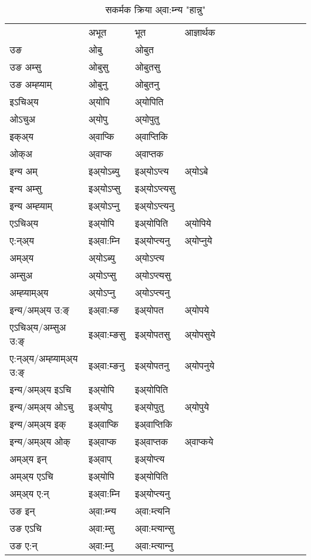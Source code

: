 \begin{table}[H]
\label{op.vt} \centering
\caption{सकर्मक क्रिया  अ्वा:म्‍न्य  "हान्नु"  }
\begin{tabular}{l|l|l|l|l|l|l|l|l|l|l|l|l}  \toprule
&अभूत & भूत & आज्ञार्थक \\ 
उङ &ओबु &ओबुत \\ 
उङ अम्सु &ओबुसु &ओबुतसु \\ 
उङ अम्ह्‍याम् &ओबुनु &ओबुतनु \\ 
इऽचिअ्य &अ्योपि &अ्योपिति   \\ 
ओऽचुअ &अ्योपु &अ्योपुतु   \\ 
इक्अ्य &अ्वाप्कि &अ्वाप्‍तिकि   \\ 
ओक्अ &अ्वाप्क &अ्वाप्‍तक   \\ 
इन्य अम् & इअ्योऽब्यु  & इअ्योऽप्‍त्य &अ्योऽबे  \\ 
इन्य अम्सु & इअ्योऽप्सु  & इअ्योऽप्‍त्यसु   \\ 
इन्य अम्ह्‍याम् & इअ्योऽप्‍नु  & इअ्योऽप्‍त्यनु   \\ 
एऽचिअ्य & इअ्योपि & इअ्योपिति &अ्योपिये    \\ 
ए:न्अ्य & इअ्वा:म्‍नि  & इअ्योप्‍त्यनु &अ्योप्‍नुये  \\ 
अम्अ्य & अ्योऽब्यु  & अ्योऽप्‍त्य  \\ 
अम्सुअ & अ्योऽप्सु & अ्योऽप्‍त्यसु  \\ 
अम्ह्‍याम्अ्य & अ्योऽप्‍नु  & अ्योऽप्‍त्यनु \\ 
\midrule
इन्य/अम्अ्य उ:ङ्‌&इअ्वा:म्ङ & इअ्योपत &अ्योपये \\ 
एऽचिअ्य/अम्सुअ उ:ङ्‌ &इअ्वा:म्ङसु & इअ्योपतसु &अ्योपसुये \\ 
ए:न्अ्य/अम्ह्‍याम्अ्य उ:ङ्‌ &इअ्वा:म्ङनु & इअ्योपतनु &अ्योपनुये \\ 
इन्य/अम्अ्य इऽचि & इअ्योपि & इअ्योपिति    \\ 
इन्य/अम्अ्य ओऽचु & इअ्योपु & इअ्योपुतु  &अ्योपुये  \\ 
इन्य/अम्अ्य इक् & इअ्वाप्कि & इअ्वाप्‍तिकि   \\ 
इन्य/अम्अ्य ओक् & इअ्वाप्क & इअ्वाप्‍तक  &अ्वाप्कये  \\ 
अम्अ्य इन् & इअ्वाप् & इअ्योप्‍त्य   \\ 
अम्अ्य एऽचि & इअ्योपि & इअ्योपिति    \\ 
अम्अ्य ए:न् & इअ्वा:म्‍नि  & इअ्योप्‍त्यनु  \\ 
\midrule
उङ इन् & अ्वा:म्‍न्य  & अ्वा:म्त्यनि  \\ 
उङ एऽचि & अ्वा:म्सु  & अ्वा:म्त्यान्सु   \\ 
उङ ए:न्& अ्वा:म्‍नु  & अ्वा:म्त्यान्‍नु   \\ 
\bottomrule
\end{tabular}
\end{table}


